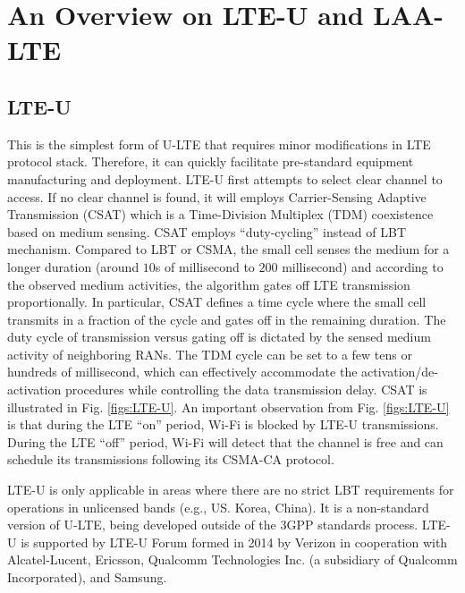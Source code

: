 \documentclass[journal,draftclsnofoot,12pt,onecolumn]{IEEEtran}
\begin{document}
\section{An Overview on LTE-U and LAA-LTE}
\label{sec:U-LTE-overview}

\subsection{LTE-U}

\noindent This is the simplest form of U-LTE that requires minor modifications in LTE protocol stack. Therefore, it can quickly facilitate pre-standard equipment manufacturing and deployment. LTE-U first attempts to select clear channel to access. If no clear channel is found, it will employs Carrier-Sensing Adaptive Transmission (CSAT) which is a Time-Division Multiplex (TDM) coexistence based on medium sensing. CSAT employs ``duty-cycling'' instead of LBT mechanism. Compared to LBT or CSMA, the small cell senses the medium for a longer duration (around $10$s of millisecond to $200$ millisecond) and according to the observed medium activities, the algorithm gates off LTE transmission proportionally. In particular, CSAT defines a time cycle where the small cell transmits in a fraction of the cycle and gates off in the remaining duration. The duty cycle of transmission versus gating off is dictated by the sensed medium activity of neighboring RANs. The TDM cycle can be set to a few tens or hundreds of millisecond, which can effectively accommodate the activation/de-activation procedures while controlling the data transmission delay. CSAT is illustrated in Fig. \ref{figs:LTE-U}. An important observation from Fig. \ref{figs:LTE-U} is that during the LTE ``on'' period, Wi-Fi is blocked by LTE-U transmissions. During the LTE ``off'' period, Wi-Fi will detect that the channel is free and can schedule its transmissions following its CSMA-CA protocol.

LTE-U is only applicable in areas where there are no strict LBT requirements for operations in unlicensed bands (e.g., US. Korea, China). It is a non-standard version of U-LTE, being developed outside of the 3GPP standards process. LTE-U is supported by LTE-U Forum formed in 2014 by Verizon in cooperation with Alcatel-Lucent, Ericsson, Qualcomm Technologies Inc. (a subsidiary of Qualcomm Incorporated), and Samsung.
\end{document}
